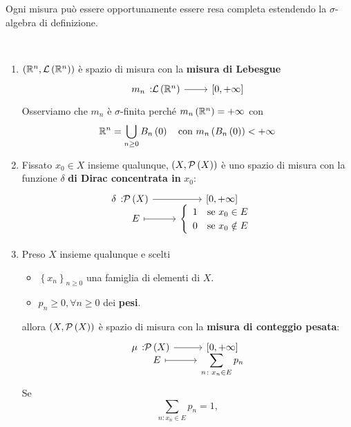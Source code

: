 \begin{observe}
	Ogni misura può essere opportunamente essere resa completa estendendo la $\sigma$-algebra di definizione.
\end{observe}
\begin{exampleswt}~{}
	\begin{enumerate}
		\item $\left(\mathbb{R}^n,\mathcal{L}\left(\mathbb{R}^n\right)\right)$ è spazio di misura con la \textbf{misura di Lebesgue}
		\begin{equation}
			\funz{m_n}{\mathcal{L}\left(\realset^n\right)}{\left[0,+\infty\right]}
		\end{equation}
		Osserviamo che $m_n$ è $\sigma$-finita perché $m_n\left(\mathbb{R}^n\right)=+\infty$ con
		\begin{equation*}
			\mathbb{R}^n=\bigcup_{n\geq 0}B_n\left(0\right)\quad\text{con }m_n\left(B_n\left(0\right)\right)<+\infty
		\end{equation*}
		\item Fissato $x_0\in X$ insieme qualunque, $\left(X,\mathcal{P}\left(X\right)\right)$ è uno spazio di misura con la funzione $\delta$ \textbf{di Dirac concentrata in} $x_0$:
		\begin{equation}
			\funztot{\delta}{\setpart{X}}{\left[0,+\infty\right]}{E}{\begin{cases}
					\begin{array}{ll}
						1&\text{se }x_0\in E\\
						0&\text{se }x_0\notin E
					\end{array}
			\end{cases}}
		\end{equation}
		\item Preso $X$ insieme qualunque e scelti
		\begin{itemize}
			\item $\left\{x_n\right\}_{n\geq 0}$ una famiglia di elementi di $X$.
			\item $p_n\geq 0, \forall n\geq 0$ dei \textbf{pesi}.
		\end{itemize}
	allora $\left(X,\mathcal{P}\left(X\right)\right)$ è spazio di misura con la \textbf{misura di conteggio pesata}:
	\begin{equation}
		\funztot{\mu}{\setpart{X}}{\left[0,+\infty\right]}{E}{\displaystyle\sum_{n\colon x_n\in E}p_n}
	\end{equation}
Se
\begin{equation*}
	\sum_{n\colon x_n\in E}p_n=1,

\end{equation*}
\end{enumerate}
\end{exampleswt}
